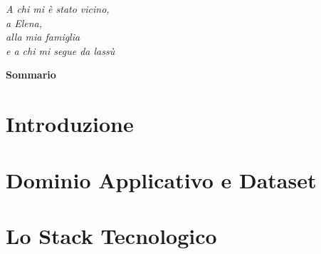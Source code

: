 \documentclass[a4paper, 11pt, oneside, openright]{book}
\begin{document}
    \pagestyle{empty}
    \hypersetup{pageanchor=false}

    
    \cleardoublepage

    \null{}
        \begin{flushright}
            \textit{A chi mi è stato vicino, \\ a Elena, \\ alla mia famiglia \\ e a chi mi segue da lassù}
        \end{flushright}
    \null
    \cleardoublepage

    \hypersetup{pageanchor=true}
    \cleardoublepage
    \label{ch:sommario}
    \vspace*{\fill}
    \begin{center}
        {\LARGE\bfseries Sommario}\par
        \vspace{2\baselineskip}
        \begin{minipage}{0.85\textwidth}
            
        \end{minipage}
    \end{center}
    \vspace*{\fill}

    \cleardoublepage
    \setcounter{tocdepth}{1}
    \tableofcontents
    \listoffigures
    \listoftables
    \cleardoublepage

    \pagestyle{fancy}
    \setcounter{page}{1}
    \setcounter{tocdepth}{1}

    \chapter{Introduzione}
    \label{ch:introduzione}
    

    \chapter{Dominio Applicativo e Dataset}
    \label{ch:dominio-applicativo-e-dataset}
    

    \chapter[Stack Tecnologico]{Lo Stack Tecnologico}
    \label{ch:lo-stack-tecnologico}
    
\end{document}
